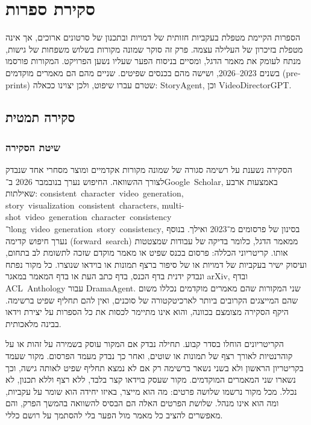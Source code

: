 \chapter{סקירת ספרות}

הספרות הקיימת מטפלת בעקביות חזותית של דמויות ובתכנון של סרטונים ארוכים, אך אינה מטפלת בזיכרון של העלילה עצמה. פרק זה סוקר שמונה מקורות בשלוש משפחות של גישות, מנתח לעומק את מאמר הדגל, ומסיים בניסוח הפער שעליו נשען הפרויקט. המקורות פורסמו בשנים \textenglish{2023–2026}, ושישה מהם בכנסים שפיטים. שניים מהם הם מאמרים מוקדמים (\textenglish{preprints}) שטרם עברו שיפוט, ולכן יצוינו ככאלה: \textenglish{StoryAgent}, וכן \textenglish{VideoDirectorGPT}.

\section{סקירה תמטית}
\subsection{שיטת הסקירה}
הסקירה נשענת על רשימה סגורה של שמונה מקורות אקדמיים ומוצר מסחרי אחד שנבדק לצורך ההשוואה. החיפוש נערך בנובמבר \textenglish{2026} ב־\mbox{\textenglish{Google Scholar}}, באמצעות ארבע שאילתות: \mbox{\textenglish{consistent character video generation}}, \mbox{\textenglish{story visualization consistent characters}}, \mbox{\textenglish{multi-shot video generation character consistency}} ו־\mbox{\textenglish{long video generation story consistency}}, בסינון של פרסומים מ־2023 ואילך. בנוסף נערך חיפוש קדימה (\mbox{\textenglish{forward search}}) ממאמר הדגל, כלומר בדיקה של עבודות שמצטטות אותו. קריטריוני הכללה: פרסום בכנס שפיט או מאמר מוקדם שזכה לתשומת לב בתחום, ועיסוק ישיר בעקביות של דמויות או של סיפור ברצף תמונות או בוידאו שנוצרו. כל מקור נפתח ונבדק ידנית בדף הכנס, בדף כתב העת או בדף המאמר במאגר \textenglish{arXiv}, ובדף \mbox{\textenglish{ACL Anthology}} עבור \textenglish{DramaAgent}. שני המקורות שהם מאמרים מוקדמים נכללו משום שהם המייצגים הקרובים ביותר לארכיטקטורה של סוכנים, ואין להם תחליף שפיט ברשימה. היקף הסקירה מצומצם בכוונה, והוא אינו מתיימר לכסות את כל הספרות על יצירת וידאו בבינה מלאכותית.

הקריטריונים הוחלו בסדר קבוע. תחילה נבדק אם המקור עוסק בשמירה על זהות או על קוהרנטיות לאורך רצף של תמונות או שוטים, ואחר כך נבדק מעמד הפרסום. מקור שעמד בקריטריון הראשון ולא בשני נשאר ברשימה רק אם לא נמצא תחליף שפיט לאותה גישה, וכך נשארו שני המאמרים המוקדמים. מקור שעסק בוידאו קצר בלבד, ללא רצף וללא תכנון, לא נכלל. מכל מקור נרשמו שלושה פרטים: מה הוא מייצר, באיזו יחידה הוא שומר על עקביות, ומה הוא אינו מנהל. שלושת הפרטים האלה הם הבסיס להשוואה בהמשך הפרק, והם מאפשרים להציב כל מאמר מול הפער בלי להסתמך על רושם כללי.

